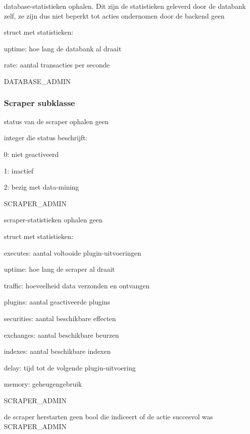 	{ database-statistieken ophalen. Dit zijn de statistieken geleverd door de databank zelf, ze zijn dus niet beperkt tot acties ondernomen door de backend }
	{ geen }
	{ struct met statistieken:
		\begin{itemize_compact}
		\item{uptime: hoe lang de databank al draait}
		\item{rate: aantal transacties per seconde}
		\end{itemize_compact} }
	{ DATABASE\_ADMIN }


\subsubsection{Scraper subklasse}

	{ status van de scraper ophalen }
	{ geen }
	{ integer die status beschrijft:
		\begin{itemize_compact}
		\item{0: niet geactiveerd}
		\item{1: inactief}
		\item{2: bezig met data-mining}
		\end{itemize_compact} }
	{ SCRAPER\_ADMIN }

	{ scraper-statistieken ophalen }
	{ geen }
	{ struct met statistieken:
		\begin{itemize_compact}
		\item{executes: aantal voltooide plugin-uitvoeringen}
		\item{uptime: hoe lang de scraper al draait}
		\item{traffic: hoeveelheid data verzonden en ontvangen}
		\item{plugins: aantal geactiveerde plugins}
		\item{securities: aantal beschikbare effecten}
		\item{exchanges: aantal beschikbare beurzen}
		\item{indexes: aantal beschikbare indexen}
		\item{delay: tijd tot de volgende plugin-uitvoering}
		\item{memory: geheugengebruik}
		\end{itemize_compact} }
	{ SCRAPER\_ADMIN }

	{ de scraper herstarten }
	{ geen }
	{ bool die indiceert of de actie succesvol was }
	{ SCRAPER\_ADMIN }

